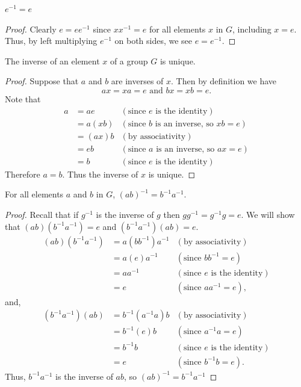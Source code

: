 \begin{proposition}
    $e^{-1} = e$
\end{proposition}
\begin{proof}
    Clearly $e = ee^{-1}$ since $xx^{-1} = e$ for all elements $x$ in $G$, including $x = e$. Thus, by left multiplying $e^{-1}$ on both sides, we see $e = e^{-1}$.
\end{proof}

\newpage

\begin{proposition}
    The inverse of an element $x$ of a group $G$ is unique.
\end{proposition}
\begin{proof}
    Suppose that $a$ and $b$ are inverses of $x$. Then by definition we have
    \[
        ax = xa = e \text{ and } bx = xb = e.
    \]
    Note that
    \begin{align*}
        a &= ae & (\text{since } e \text{ is the identity})\\
        &= a(xb) & (\text{since } b \text{ is an inverse, so } xb = e)\\
        &= (ax)b & (\text{by associativity})\\
        &= eb & (\text{since } a \text{ is an inverse, so } ax = e)\\
        &= b & (\text{since } e \text{ is the identity})
    \end{align*}
    Therefore $a = b$. Thus the inverse of $x$ is unique.
\end{proof}

\begin{proposition}
    For all elements $a$ and $b$ in $G$, $(ab)^{-1} = b^{-1}a^{-1}$.
\end{proposition}
\begin{proof}
    Recall that if $g^{-1}$ is the inverse of $g$ then $gg^{-1} = g^{-1}g = e$. We will show that $(ab)(b^{-1}a^{-1}) = e$ and $(b^{-1}a^{-1})(ab) = e$.
    \begin{align*}
        (ab)(b^{-1}a^{-1}) &= a(bb^{-1})a^{-1} & (\text{by associativity})\\
        &= a(e)a^{-1} & (\text{since } bb^{-1} = e)\\
        &= aa^{-1} & (\text{since } e \text{ is the identity})\\
        &= e & (\text{since } aa^{-1} = e),
    \end{align*}
    and,
    \begin{align*}
        (b^{-1}a^{-1})(ab) &= b^{-1}(a^{-1}a)b & (\text{by associativity})\\
        &= b^{-1}(e)b & (\text{since } a^{-1}a = e)\\
        &= b^{-1}b & (\text{since } e \text{ is the identity})\\
        &= e & (\text{since } b^{-1}b = e).
    \end{align*}
    Thus, $b^{-1}a^{-1}$ is the inverse of $ab$, so $(ab)^{-1} = b^{-1}a^{-1}$
\end{proof}

